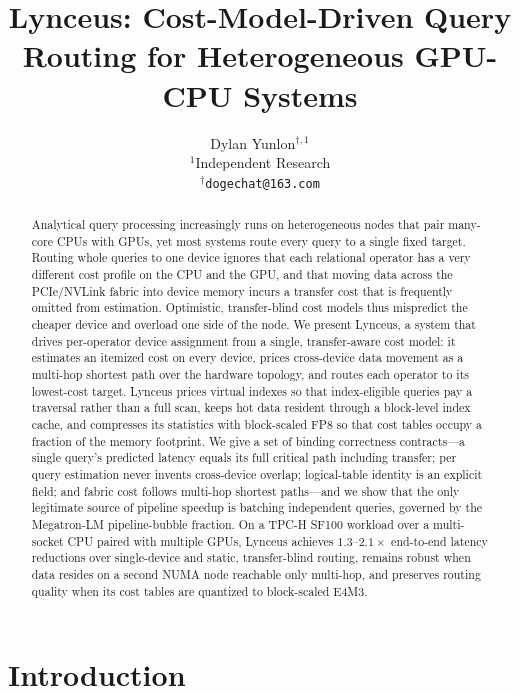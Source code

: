 \documentclass{article}
\title{Lynceus: Cost-Model-Driven Query Routing for Heterogeneous GPU-CPU Systems}
\author{
  Dylan Yunlon$^{\dagger,1}$ \\
  $^{1}$Independent Research \\
  $^{\dagger}$\texttt{dogechat@163.com}
}
\begin{document}
\maketitle

\begin{abstract}
Analytical query processing increasingly runs on heterogeneous nodes that pair
many-core CPUs with GPUs, yet most systems route every query to a single fixed
target. Routing whole queries to one device ignores that each relational operator
has a very different cost profile on the CPU and the GPU, and that moving data
across the PCIe/NVLink fabric into device memory incurs a transfer cost that is
frequently omitted from estimation. Optimistic, transfer-blind cost models thus
mispredict the cheaper device and overload one side of the node. We present
Lynceus, a system that drives per-operator device assignment from a single,
transfer-aware cost model: it estimates an itemized cost on every device, prices
cross-device data movement as a multi-hop shortest path over the hardware
topology, and routes each operator to its lowest-cost target. Lynceus prices
virtual indexes so that index-eligible queries pay a traversal rather than a full
scan, keeps hot data resident through a block-level index cache, and compresses
its statistics with block-scaled FP8 so that cost tables occupy a fraction of the
memory footprint. We give a set of binding correctness contracts---a single
query's predicted latency equals its full critical path including transfer; per
query estimation never invents cross-device overlap; logical-table identity is an
explicit field; and fabric cost follows multi-hop shortest paths---and we show
that the only legitimate source of pipeline speedup is batching independent
queries, governed by the Megatron-LM pipeline-bubble fraction. On a TPC-H SF100
workload over a multi-socket CPU paired with multiple GPUs, Lynceus achieves
$1.3$--$2.1\times$ end-to-end latency reductions over single-device and static,
transfer-blind routing, remains robust when data resides on a second NUMA node
reachable only multi-hop, and preserves routing quality when its cost tables are
quantized to block-scaled E4M3.
\end{abstract}

\section{Introduction}
\label{sec:introduction}
\end{document}
